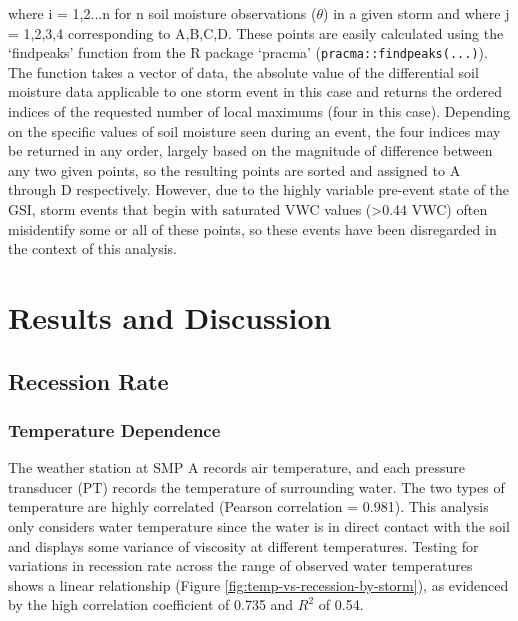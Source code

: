 where i = {1,2...n} for n soil moisture observations ($\theta$) in a given storm and where j = {1,2,3,4} corresponding to {A,B,C,D}.
These points are easily calculated using the `findpeaks' function from the R package `pracma' (\verb+pracma::findpeaks(...)+).
The function takes a vector of data, the absolute value of the differential soil moisture data applicable to one storm event in this case and returns the ordered indices of the requested number of local maximums (four in this case).
Depending on the specific values of soil moisture seen during an event, the four indices may be returned in any order, largely based on the magnitude of difference between any two given points, so the resulting points are sorted and assigned to A through D respectively.
However, due to the highly variable pre-event state of the GSI, storm events that begin with saturated VWC values (>0.44 VWC) often misidentify some or all of these points, so these events have been disregarded in the context of this analysis.

\section{Results and Discussion}

\subsection{Recession Rate}

\subsubsection{Temperature Dependence}
The weather station at SMP A records air temperature, and each pressure transducer (PT) records the temperature of surrounding water.
The two types of temperature are highly correlated (Pearson correlation = 0.981).
This analysis only considers water temperature since the water is in direct contact with the soil and displays some variance of viscosity at different temperatures.
Testing for variations in recession rate across the range of observed water temperatures shows a linear relationship (Figure \ref{fig:temp-vs-recession-by-storm}), as evidenced by the high correlation coefficient of 0.735 and $R^2$ of 0.54.

